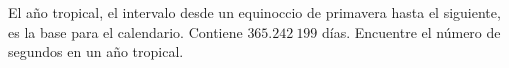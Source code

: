 \item El año tropical, el intervalo desde un equinoccio de primavera hasta el siguiente, es la base para el calendario. Contiene $365.242\ 199$ días. Encuentre el número de segundos en un año tropical.
